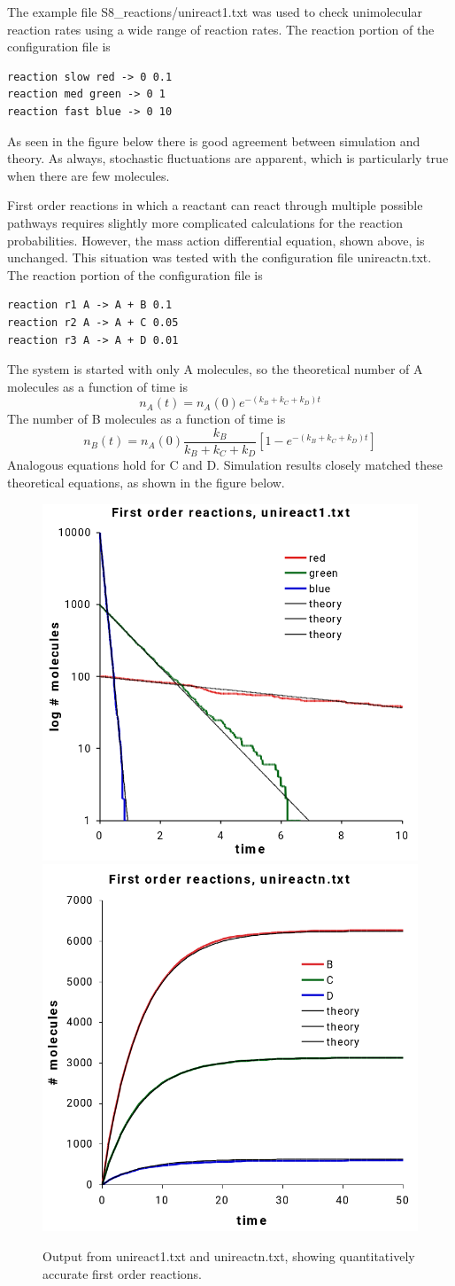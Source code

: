 \documentclass {book}
\begin{document}
The example file S8\_reactions/unireact1.txt was used to check unimolecular reaction rates using a wide range of reaction rates. The reaction portion of the configuration file is

\begin{lstlisting}[style=SSAC]
reaction slow red -> 0 0.1
reaction med green -> 0 1
reaction fast blue -> 0 10
\end{lstlisting}
As seen in the figure below there is good agreement between simulation and theory. As always, stochastic fluctuations are apparent, which is particularly true when there are few molecules.

First order reactions in which a reactant can react through multiple possible pathways requires slightly more complicated calculations for the reaction probabilities. However, the mass action differential equation, shown above, is unchanged. This situation was tested with the configuration file unireactn.txt. The reaction portion of the configuration file is

\begin{lstlisting}[style=SSAC]
reaction r1 A -> A + B 0.1
reaction r2 A -> A + C 0.05
reaction r3 A -> A + D 0.01
\end{lstlisting}
The system is started with only A molecules, so the theoretical number of A molecules as a function of time is
$$n_A(t) = n_A(0) e^{-(k_B+k_C+k_D)t}$$
The number of B molecules as a function of time is
$$n_B(t) = n_A(0) \frac{k_B}{k_B+k_C+k_D} \left[1-e^{-(k_B+k_C+k_D)t} \right]$$
Analogous equations hold for C and D. Simulation results closely matched these theoretical equations, as shown in the figure below.

\begin{figure}[h]
\centering
\includegraphics[height=5 cm]{figures/image34}
\includegraphics[height=5 cm]{figures/image35}
\caption{Output from unireact1.txt and unireactn.txt, showing quantitatively accurate first order reactions.}
\label{fig:unireact1}
\end{figure}
\end{document}

